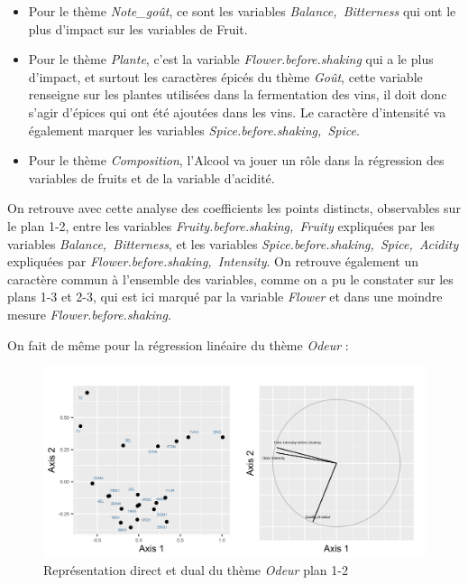 \documentclass[a4paper,french,10pt]{article}
\begin{document}
\begin{itemize}
	\item Pour le thème \textit{Note\_goût}, ce sont les variables \textit{Balance,~Bitterness} qui ont le plus d'impact sur les variables de Fruit.
	\item Pour le thème \textit{Plante}, c'est la variable \textit{Flower.before.shaking} qui a le plus d'impact, et surtout les caractères épicés du thème \textit{Goût}, cette variable renseigne sur les plantes utilisées dans la fermentation des vins, il doit donc s'agir d'épices qui ont été ajoutées dans les vins. Le caractère d'intensité va également marquer les variables \textit{Spice.before.shaking,~Spice}.
	\item Pour le thème \textit{Composition}, l'Alcool va jouer un rôle dans la régression des variables de fruits et de la variable d'acidité. 
\end{itemize}
\bigskip

On retrouve avec cette analyse des coefficients les points distincts, observables sur le plan 1-2, entre les variables \textit{Fruity.before.shaking,~Fruity} expliquées par les variables \textit{Balance,~Bitterness}, et les variables \textit{Spice.before.shaking,~Spice,~Acidity} expliquées par \textit{Flower.before.shaking,~Intensity}. On retrouve également un caractère commun à l'ensemble des variables, comme on a pu le constater sur les plans 1-3 et 2-3, qui est ici marqué par la variable \textit{Flower} et dans une moindre mesure \textit{Flower.before.shaking}. \newline

On fait de même pour la régression linéaire du thème \textit{Odeur} : 

\begin{figure}[htp] 
	\centering
	\includegraphics[scale=0.8]{images/Plot.IndVar_B1_1.2.png}
	\caption{Représentation direct et dual du thème \textit{Odeur} plan 1-2}
\end{figure}
\end{document}
